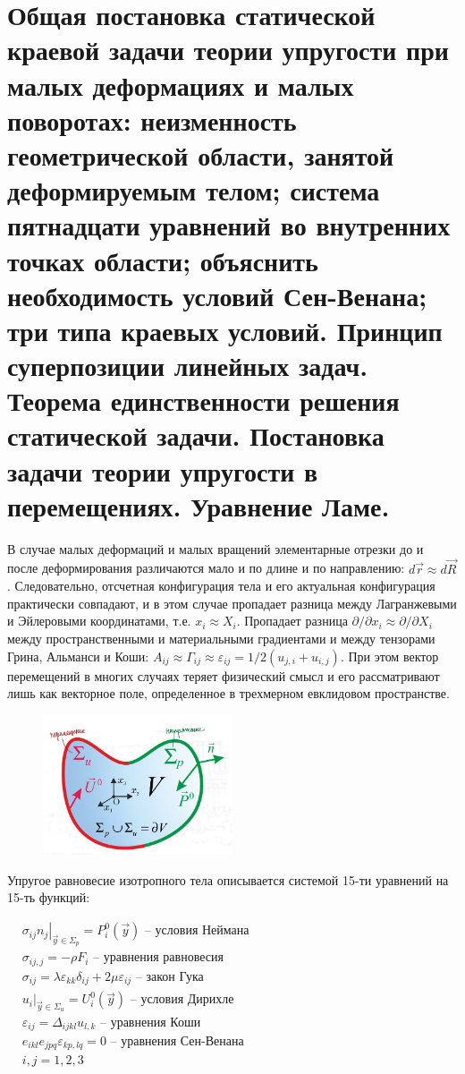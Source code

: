\vfill


\section{Общая постановка статической краевой задачи теории упругости при малых деформациях и малых поворотах: неизменность геометрической области, занятой деформируемым телом; система пятнадцати уравнений во внутренних точках области; объяснить необходимость условий Сен-Венана; три типа краевых условий. Принцип суперпозиции линейных задач. Теорема единственности решения статической задачи. Постановка задачи теории упругости в перемещениях. Уравнение Ламе.}


В случае малых деформаций и малых вращений элементарные отрезки до и после деформирования различаются мало и по длине и по направлению: $d \vec{r} \approx d \vec{R}$. Следовательно, отсчетная конфигурация тела и его актуальная конфигурация практически совпадают, и в этом случае пропадает разница между Лагранжевыми и Эйлеровыми координатами, т.е. $x_i \approx X_i$. Пропадает разница $\partial / \partial x_i \approx \partial / \partial X_i$ между пространственными и материальными градиентами и между тензорами Грина, Альманси и Коши: $A_{i j} \approx \Gamma_{i j} \approx \varepsilon_{i j}=1 / 2\left(u_{j, i}+u_{i, j}\right)$. При этом вектор перемещений в многих случаях теряет физический смысл и его рассматривают лишь как векторное поле, определенное в трехмерном евклидовом пространстве.

\begin{figure}[h!]
  \centering
  \includegraphics[width=0.5\textwidth]{images/13.1.jpg}
\end{figure}



Упругое равновесие изотропного тела описывается системой 15-ти уравнений на 15-ть функций:


$\begin{aligned} & \left.\sigma_{i j} n_j\right|_{\vec{y} \in \Sigma_p}=P_i^0(\vec{y})  \text{ -- условия Неймана} \\ &
 \sigma_{i j, j}=-\rho F_i \text{ -- уравнения равновесия} \\ &
\sigma_{i j}=\lambda \varepsilon_{k k} \delta_{i j}+2 \mu \varepsilon_{i j} \text{ --  закон Гука} \\ & 
\left.u_i\right|_{\vec{y} \in \Sigma_u}=U_i^0(\vec{y}) \text{ -- условия Дирихле} \\ &
 \varepsilon_{i j}=\Delta_{i j k l} u_{l, k} \text{ -- уравнения Коши}  \\ &
 e_{i k l} e_{j p q} \varepsilon_{k p, l q}=0 \text{ -- уравнения Сен-Венана}\\ &
 i, j=1,2,3 
 \end{aligned}$


